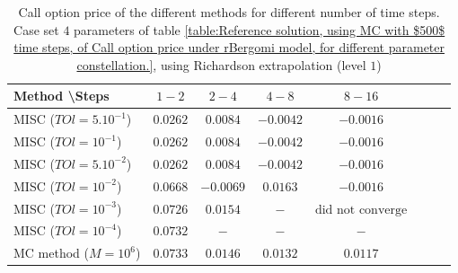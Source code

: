 \documentclass[11pt]{article}
\begin{document}
\begin{table}[h!]
	\centering
	\begin{tabular}{l*{6}{c}r}
		Method \textbackslash  Steps    &$1-2$         & $2-4$ & $4-8$ & $8-16$\\
		\hline
		MISC ($TOl=5.10^{-1}$)& $0.0262$  & $0.0084$ & $-0.0042$ & $-0.0016$ \\
		MISC ($TOl=10^{-1}$)  &$0.0262$  & $0.0084$ & $-0.0042$ & $-0.0016$  \\
		MISC ($TOl=5.10^{-2}$)  &$0.0262$  & $0.0084$ & $-0.0042$ & $-0.0016$  \\
		MISC ($TOl=10^{-2}$)  & $0.0668$  & $-0.0069$ & $0.0163$ & $-0.0016$  \\
		MISC ($TOl=10^{-3}$)  & $0.0726$ & $0.0154$ & $-$ & $\text{did not converge}$ \\
		MISC ($TOl=10^{-4}$)  & $0.0732$ & $-$ & $-$ & $-$  \\
		\hline
		MC method ($M=10^6$)  &$0.0733$ & $0.0146$ & $0.0132$ & $0.0117$ \\
		\hline
	\end{tabular}
	\caption{Call option price of the different methods for different number of time steps. Case set $4$ parameters of table \ref{table:Reference solution, using MC with $500$ time steps, of Call option price under rBergomi model, for different parameter constellation.}, using Richardson extrapolation (level $1$)}
	\label{table:  Call option price of the different methods for different number of time steps. Case set $4$ parameter, using Richardson extrapolation (level $1$)}
\end{table}
\end{document}
